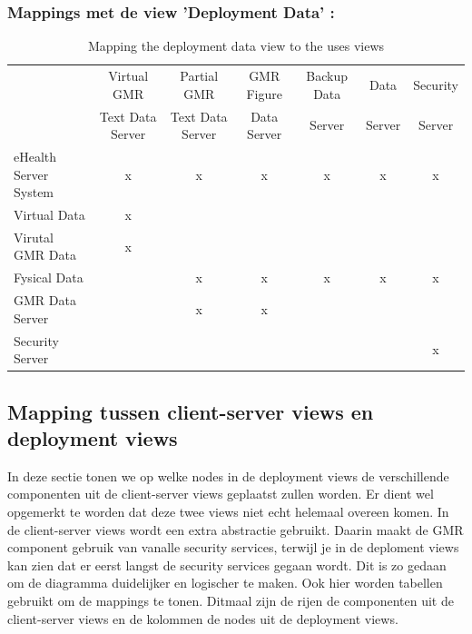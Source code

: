 \documentclass[a4paper,10pt]{article}
\begin{document}
\subsubsection{Mappings met de view 'Deployment Data' : }
\begin{table}[h!]
\begin{center}
 \begin{tabular}{l| c | c | c | c | c | c |} 
 & Virtual GMR & Partial GMR & GMR Figure & Backup Data & Data& Security \\
 & Text Data Server & Text Data Server & Data Server & Server & Server & Server \\ \hline
eHealth Server System & x & x & x & x & x & x \\ \hline
\hspace{6pt}Virtual Data & x & & & & & \\ \hline
\hspace{12pt}Virutal GMR Data & x & & & & & \\ \hline
\hspace{6pt}Fysical Data & & x & x & x & x & x \\ \hline
\hspace{12pt}GMR Data Server & & x & x & & & \\ \hline
\hspace{12pt}Security Server & & & & & & x \\ \hline
\end{tabular}
\caption{Mapping the deployment data view to the uses views}
\end{center}
\end{table}

\subsection{Mapping tussen client-server views en deployment views}
In deze sectie tonen we op welke nodes in de deployment views de verschillende componenten uit de client-server views geplaatst zullen worden. Er dient wel opgemerkt te worden dat deze twee views niet echt helemaal overeen komen. In de client-server views wordt een extra abstractie gebruikt. Daarin maakt de GMR component gebruik van vanalle security services, terwijl je in de deploment views kan zien dat er eerst langst de security services gegaan wordt. Dit is zo gedaan om de diagramma duidelijker en logischer te maken. Ook hier worden tabellen gebruikt om de mappings te tonen. Ditmaal zijn de rijen de componenten uit de client-server views en de kolommen de nodes uit de deployment views.
\clearpage
\end{document}

